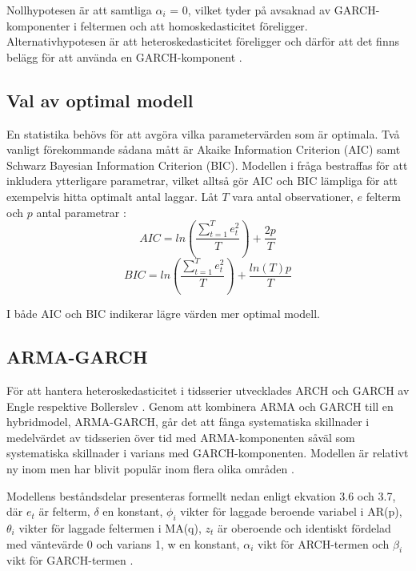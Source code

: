 \documentclass[11pt]{article}
\numberwithin{equation}{section}
\numberwithin{table}{section}
\numberwithin{figure}{section}
\begin{document}
Nollhypotesen är att samtliga \(\alpha_i\) = 0, vilket tyder på avsaknad av GARCH-komponenter i feltermen och att homoskedasticitet föreligger. Alternativhypotesen är att heteroskedasticitet föreligger och därför att det finns belägg för att använda en GARCH-komponent \parencite{engle1982autoregressive}. 

\subsection{Val av optimal modell}
En statistika behövs för att avgöra vilka parametervärden som är optimala. Två vanligt förekommande sådana mått är Akaike Information Criterion (AIC) samt Schwarz Bayesian Information Criterion (BIC). Modellen i fråga bestraffas för att inkludera ytterligare parametrar, vilket alltså gör AIC och BIC lämpliga för att exempelvis hitta optimalt antal laggar. Låt $T$ vara antal observationer, $e$ felterm och $p$ antal parametrar \parencite[][s.76 f.]{montgomery2015forecasting}:
\begin{equation}
    AIC = ln\left( \frac{\sum_{t=1}^{T}e^2_t}{T} \right)+\frac{2p}{T}
\end{equation}
\begin{equation}
    BIC = ln\left( \frac{\sum_{t=1}^{T}e^2_t}{T} \right)+\frac{ln(T)p}{T}
\end{equation}

I både AIC och BIC indikerar lägre värden mer optimal modell. 

\subsection{ARMA-GARCH}
För att hantera heteroskedasticitet i tidsserier utvecklades ARCH och GARCH av Engle \parencite*{engle1982autoregressive} respektive Bollerslev \parencite*{bollerslev1986generalized}. Genom att kombinera ARMA och GARCH till en hybridmodel, ARMA-GARCH, går det att fånga systematiska skillnader i medelvärdet av tidsserien över tid med ARMA-komponenten såväl som systematiska skillnader i varians med GARCH-komponenten. Modellen är relativt ny inom men har blivit populär inom flera olika områden \parencite{chen2011short}. 

Modellens beståndsdelar presenteras formellt nedan enligt ekvation 3.6 och 3.7, där \(e_t\) är felterm, \(\delta\) en konstant, \(\phi_i\) vikter för laggade beroende variabel i AR(p), \(\theta_i\) vikter för laggade feltermen i MA(q), \(z_t\) är oberoende och identiskt fördelad med väntevärde 0 och varians 1, w en konstant, \(\alpha_i\) vikt för ARCH-termen och \(\beta_i\) vikt för GARCH-termen \parencite[][,s.507 ff.]{bollerslev1986generalized, montgomery2015forecasting}.
\end{document}
